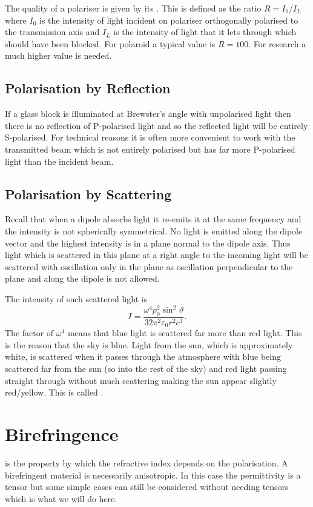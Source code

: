     The quality of a polariser is given by its .
    This is defined as the ratio \(R = I_0 / I_L\) where \(I_0\) is the intensity of light incident on polariser orthogonally polarised to the transmission axis and \(I_L\) is the intensity of light that it lets through which should have been blocked.
    For polaroid a typical value is \(R = 100\).
    For research a much higher value is needed.
    
    \subsection{Polarisation by Reflection}
    If a glass block is illuminated at Brewster's angle with unpolarised light then there is no reflection of P-polarised light and so the reflected light will be entirely S-polarised.
    For technical reasons it is often more convenient to work with the transmitted beam which is not entirely polarised but has far more P-polarised light than the incident beam.
    
    \subsection{Polarisation by Scattering}
    Recall that when a dipole absorbs light it re-emits it at the same frequency and the intensity is not spherically symmetrical.
    No light is emitted along the dipole vector and the highest intensity is in a plane normal to the dipole axis.
    Thus light which is scattered in this plane at a right angle to the incoming light will be scattered with oscillation only in the plane as oscillation perpendicular to the plane and along the dipole is not allowed.
    
    The intensity of such scattered light is
    \[I = \frac{\omega^4 p_0^2\sin^2\vartheta}{32\pi^2\varepsilon_0r^2c^3}.\]
    The factor of \(\omega^4\) means that blue light is scattered far more than red light.
    This is the reason that the sky is blue.
    Light from the sun, which is approximately white, is scattered when it passes through the atmosphere with blue being scattered far from the sun (so into the rest of the sky) and red light passing straight through without much scattering making the sun appear slightly red/yellow.
    This is called .
    
    \section{Birefringence}
     is the property by which the refractive index depends on the polarisation.
    A birefringent material is necessarily anisotropic.
    In this case the permittivity is a tensor but some simple cases can still be considered without needing tensors which is what we will do here.
    
